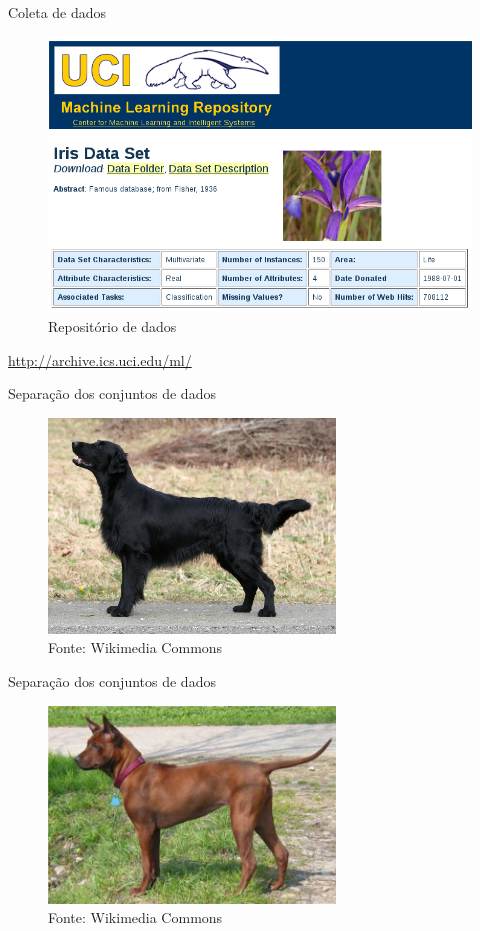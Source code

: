 \documentclass{beamer}
\begin{document}
    \begin{frame}{Coleta de dados}
      \begin{figure}[htpb]
	\includegraphics[scale=0.4]{machine.png}
	\caption{Repositório de dados}
      \end{figure}
      \url{http://archive.ics.uci.edu/ml/}
    \end{frame}
    
    \begin{frame}{Separação dos conjuntos de dados}
      \begin{figure}[htpb]
	\includegraphics[width=3in]{dog1.jpg}
	\caption{Fonte: Wikimedia Commons}
      \end{figure}
    \end{frame}

    \begin{frame}{Separação dos conjuntos de dados}
      \begin{figure}[htpb]
	\includegraphics[width=3in]{dog2.jpg}
	\caption{Fonte: Wikimedia Commons}
      \end{figure}
    \end{frame}
    
\end{document}
